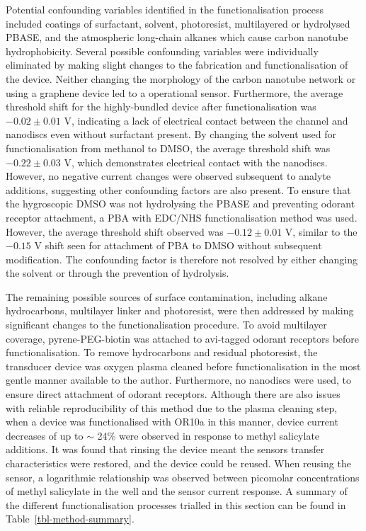 \documentclass[
  a4paper,
]{scrbook}
\begin{document}
Potential confounding variables identified in the functionalisation
process included coatings of surfactant, solvent, photoresist,
multilayered or hydrolysed PBASE, and the atmospheric long-chain alkanes
which cause carbon nanotube hydrophobicity. Several possible confounding
variables were individually eliminated by making slight changes to the
fabrication and functionalisation of the device. Neither changing the
morphology of the carbon nanotube network or using a graphene device led
to a operational sensor. Furthermore, the average threshold shift for
the highly-bundled device after functionalisation was \(−0.02 \pm 0.01\)
V, indicating a lack of electrical contact between the channel and
nanodiscs even without surfactant present. By changing the solvent used
for functionalisation from methanol to DMSO, the average threshold shift
was \(−0.22 \pm 0.03\) V, which demonstrates electrical contact with the
nanodiscs. However, no negative current changes were observed subsequent
to analyte additions, suggesting other confounding factors are also
present. To ensure that the hygroscopic DMSO was not hydrolysing the
PBASE and preventing odorant receptor attachment, a PBA with EDC/NHS
functionalisation method was used. However, the average threshold shift
observed was \(-0.12 \pm 0.01\) V, similar to the \(-0.15\) V shift seen
for attachment of PBA to DMSO without subsequent modification. The
confounding factor is therefore not resolved by either changing the
solvent or through the prevention of hydrolysis.

The remaining possible sources of surface contamination, including
alkane hydrocarbons, multilayer linker and photoresist, were then
addressed by making significant changes to the functionalisation
procedure. To avoid multilayer coverage, pyrene-PEG-biotin was attached
to avi-tagged odorant receptors before functionalisation. To remove
hydrocarbons and residual photoresist, the transducer device was oxygen
plasma cleaned before functionalisation in the most gentle manner
available to the author. Furthermore, no nanodiscs were used, to ensure
direct attachment of odorant receptors. Although there are also issues
with reliable reproducibility of this method due to the plasma cleaning
step, when a device was functionalised with OR10a in this manner, device
current decreases of up to \(\sim\) 24\% were observed in response to
methyl salicylate additions. It was found that rinsing the device meant
the sensors transfer characteristics were restored, and the device could
be reused. When reusing the sensor, a logarithmic relationship was
observed between picomolar concentrations of methyl salicylate in the
well and the sensor current response. A summary of the different
functionalisation processes trialled in this section can be found in
Table~\ref{tbl-method-summary}.
\end{document}
